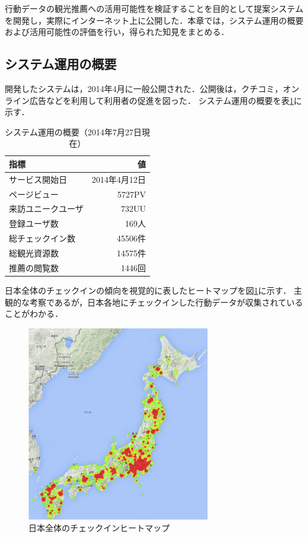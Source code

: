 \documentclass{jsarticle}
\begin{document}
行動データの観光推薦への活用可能性を検証することを目的として提案システムを開発し，実際にインターネット上に公開した．本章では，システム運用の概要および活用可能性の評価を行い，得られた知見をまとめる．

\newpage
\subsection{システム運用の概要}

開発したシステムは，2014年4月に一般公開された．公開後は，クチコミ，オンライン広告などを利用して利用者の促進を図った．
システム運用の概要を表\ref{operation_description}に示す．


\begin{table}[!h]
\small
\caption{システム運用の概要（2014年7月27日現在）}
\begin{center}
\begin{tabular}{l|r}
\label{operation_description}
指標 & 値 \\ \hline
サービス開始日 & 2014年4月12日 \\
ページビュー & 5727PV \\
来訪ユニークユーザ & 732UU \\
登録ユーザ数 & 169人 \\
総チェックイン数 & 45506件 \\
総観光資源数 & 14575件 \\
推薦の閲覧数 & 1446回 \\
\end{tabular}
\end{center}
\end{table}
    
日本全体のチェックインの傾向を視覚的に表したヒートマップを図\ref{heatmap1}に示す．
主観的な考察であるが，日本各地にチェックインした行動データが収集されていることがわかる．

\begin{figure}[!ht]
\begin{center}
\includegraphics[width=8.0cm]{./image/heatmap1.png}
\caption{日本全体のチェックインヒートマップ}
\label{heatmap1}
\end{center}
\end{figure}
\end{document}
